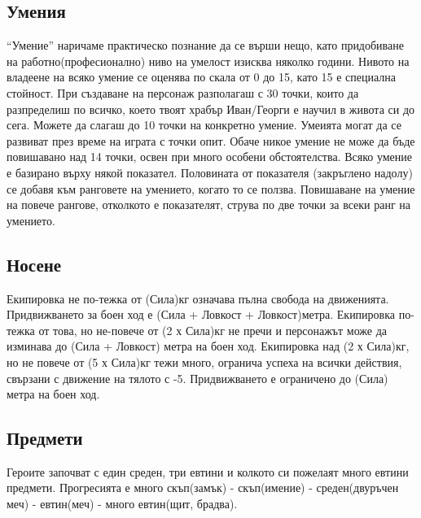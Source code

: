 \subsection{Умения}
“Умение” наричаме практическо познание да се върши нещо, като придобиване на
работно(професионално) ниво на умелост изисква няколко години. Нивото на
владеене на всяко умение се оценява по скала от 0 до 15, като 15 е специална стойност.
При създаване на персонаж разполагаш с 30 точки, които да разпределиш по всичко,
което твоят храбър Иван/Георги е научил в живота си до сега. Можете да слагаш до 10 точки на конкретно умение.
Умеията могат да се развиват през време на играта с точки опит. Обаче никое
умение не може да бъде повишавано над 14 точки, освен при много особени обстоятелства.
Всяко умение е базирано върху някой показател. Половината от показателя
(закръглено надолу) се добавя към ранговете на умението, когато то се ползва.
Повишаване на умение на повече рангове,  отколкото е показателят, струва по две
точки за всеки ранг на умението.

\subsection{Носене}
Екипировка не по-тежка от (Сила)кг означава пълна свобода на движенията.
Придвижването за боен ход е (Сила + Ловкост + Ловкост)метра.
Екипировка по-тежка от това, но не-повече от (2 х Сила)кг не пречи и персонажът
 може да изминава до (Сила + Ловкост) метра на боен ход.
Екипировка над (2 х Сила)кг, но не повече от (5 х Сила)кг тежи много, огранича
успеха на всички действия, свързани с движение на тялото с -5. Придвижването е
ограничено до (Сила) метра на боен ход.

\subsection{Предмети}
Героите започват с един среден, три евтини и колкото си пожелаят много евтини предмети. Прогресията е много скъп(замък) - скъп(имение) - среден(двуръчен меч) - евтин(меч) - много евтин(щит, брадва).
